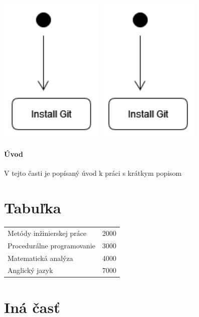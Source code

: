 \documentclass[10pt,twoside,slovak,a4paper]{article}
\begin{document}
\hfil
\includegraphics[scale=1.0, angle=90]{diagram.pdf}
\hfil
\includegraphics[scale=1.0]{diagram.pdf}
\hfil

\paragraph{Úvod} V tejto časti je popísaný úvod k práci s krátkym popisom

\section{Tabuľka} \label{časť textu}

\begin{tabular}{lc}
Metódy inžinierskej práce & 2000 \\
Procedurálne programovanie & 3000 \\
Matematická analýza & 4000 \\
Anglický jazyk & 7000 \\
\end{tabular}

\section{Iná časť} \label{ina}
\end{document}
